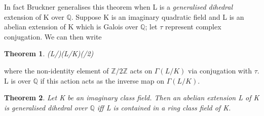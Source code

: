 \documentclass[preprint,12pt,leqno]{elsarticle}
\newtheorem{theorem}{Theorem}
\begin{document}
In fact Bruckner \cite{BRUC} generalises this theorem when L is a \textit{generalised dihedral} extension of K over $\mathbb{Q}$. Suppose K is an imaginary quadratic field and L is an abelian extension of K which is Galois over $\mathbb{Q}$; let $\tau$ represent complex conjugation. We can then write
\begin{theorem}
\Gamma(L/)\cong \Gamma(L/K)\rtimes(/2)
\end{theorem}
where the non-identity element of $\mathbb{Z}/2\mathbb{Z}$ acts on $\Gamma(L/K)$ via conjugation with $\tau$. L is  over $\mathbb{Q}$ if this action acts as the inverse map on $\Gamma(L/K)$.
\begin{theorem}
Let K be an imaginary class field. Then an abelian extension L of K is generalised dihedral over $\mathbb{Q}$ iff L is contained in a ring class field of K.
\end{theorem}
\end{document}
